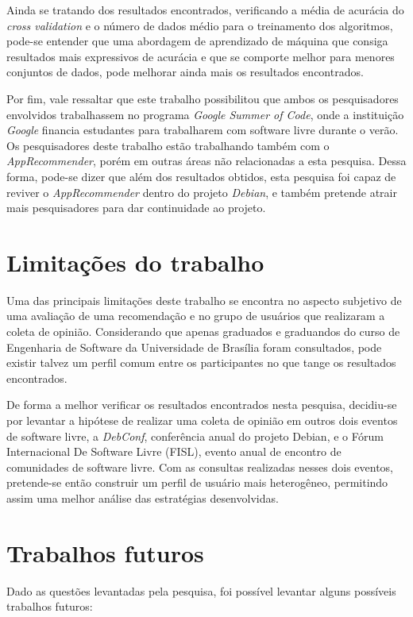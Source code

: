Ainda se tratando dos resultados encontrados, verificando a média de acurácia do
\textit{cross validation} e o número de dados médio para o treinamento dos
algoritmos, pode-se entender que uma abordagem de aprendizado de máquina que
consiga resultados mais expressivos de acurácia e que se comporte melhor para
menores conjuntos de dados, pode melhorar ainda mais os resultados encontrados.

Por fim, vale ressaltar que este
trabalho possibilitou que ambos os pesquisadores envolvidos trabalhassem no
programa \textit{Google Summer of Code}, onde a instituição \textit{Google}
financia estudantes para trabalharem com software livre durante o verão. Os
pesquisadores deste trabalho estão trabalhando também com o
\textit{AppRecommender}, porém em outras áreas não relacionadas a esta pesquisa.
Dessa forma, pode-se dizer que além dos resultados obtidos, esta pesquisa foi
capaz de reviver o \textit{AppRecommender} dentro do projeto \textit{Debian},
e também pretende atrair mais pesquisadores para dar continuidade ao projeto.

\section{Limitações do trabalho}

Uma das principais limitações deste trabalho se encontra no aspecto subjetivo de
uma avaliação de uma recomendação e no grupo de usuários que realizaram a coleta
de opinião. Considerando que apenas graduados e graduandos do curso de Engenharia
de Software da Universidade de Brasília foram consultados, pode existir talvez
um perfil comum entre os participantes no que tange os resultados encontrados.

De forma a melhor verificar os resultados encontrados nesta pesquisa, decidiu-se
por levantar a hipótese de realizar uma coleta de opinião em outros dois eventos
de software livre, a \textit{DebConf}, conferência anual do projeto Debian, e o
Fórum Internacional De Software Livre (FISL), evento anual de encontro de
comunidades de software livre. Com as consultas realizadas nesses dois eventos,
pretende-se então construir um perfil de usuário mais heterogêneo, permitindo
assim uma melhor análise das estratégias desenvolvidas.

\section{Trabalhos futuros}

Dado as questões levantadas pela pesquisa, foi possível levantar alguns
possíveis trabalhos futuros:


